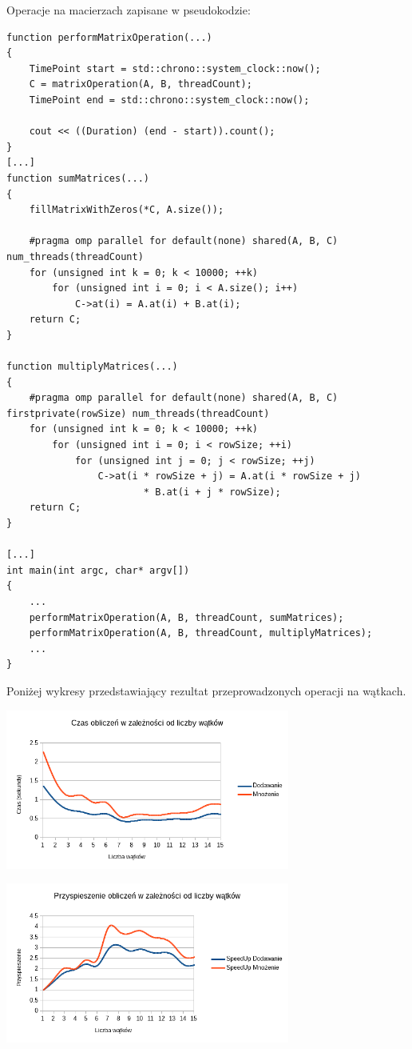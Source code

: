 \documentclass[a4paper,12pt]{article}
\begin{document}
Operacje na macierzach zapisane w pseudokodzie:
\begin{lstlisting}
function performMatrixOperation(...)
{
	TimePoint start = std::chrono::system_clock::now();
	C = matrixOperation(A, B, threadCount);
	TimePoint end = std::chrono::system_clock::now();

	cout << ((Duration) (end - start)).count();
}
[...]
function sumMatrices(...)
{
	fillMatrixWithZeros(*C, A.size());

	#pragma omp parallel for default(none) shared(A, B, C) num_threads(threadCount)
	for (unsigned int k = 0; k < 10000; ++k)
		for (unsigned int i = 0; i < A.size(); i++)
			C->at(i) = A.at(i) + B.at(i);
	return C;
}

function multiplyMatrices(...)
{
	#pragma omp parallel for default(none) shared(A, B, C) firstprivate(rowSize) num_threads(threadCount)
	for (unsigned int k = 0; k < 10000; ++k)
		for (unsigned int i = 0; i < rowSize; ++i)
			for (unsigned int j = 0; j < rowSize; ++j)
				C->at(i * rowSize + j) = A.at(i * rowSize + j)
						* B.at(i + j * rowSize);
	return C;
}

[...]
int main(int argc, char* argv[])
{
	...
	performMatrixOperation(A, B, threadCount, sumMatrices);
	performMatrixOperation(A, B, threadCount, multiplyMatrices);
	...
}
\end{lstlisting}

Poniżej wykresy przedstawiający rezultat przeprowadzonych operacji na wątkach.
\\
\begin{center}
\includegraphics[width=0.7\textwidth]{data/czas.png}
\end{center}

\begin{center}
\includegraphics[width=0.7\textwidth]{data/przysp.png}
\end{center}
\end{document}
